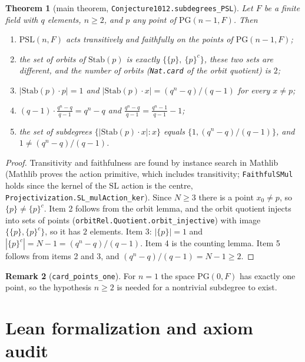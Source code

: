 \documentclass[11pt]{article}
\newtheorem{theorem}{Theorem}
\theoremstyle{definition}
\newtheorem{remark}[theorem]{Remark}
\newcommand{\PSL}{\mathrm{PSL}}
\newcommand{\SL}{\mathrm{SL}}
\newcommand{\PG}{\mathrm{PG}}
\newcommand{\Stab}{\mathrm{Stab}}
\begin{document}
\begin{theorem}[main theorem, \texttt{Conjecture1012.subdegrees\_PSL}]
Let $F$ be a finite field with $q$ elements, $n\ge 2$, and $p$ any point of $\PG(n-1,F)$. Then
\begin{enumerate}
\item $\PSL(n,F)$ acts transitively and faithfully on the points of $\PG(n-1,F)$;
\item the set of orbits of $\Stab(p)$ is exactly $\{\{p\},\ \{p\}^c\}$, these two sets are
  different, and the number of orbits (\texttt{Nat.card} of the orbit quotient) is $2$;
\item $|\Stab(p)\cdot p|=1$ and $|\Stab(p)\cdot x|=(q^n-q)/(q-1)$ for every $x\neq p$;
\item $(q-1)\cdot\frac{q^n-q}{q-1}=q^n-q$ and $\frac{q^n-q}{q-1}=\frac{q^n-1}{q-1}-1$;
\item the set of subdegrees $\{|\Stab(p)\cdot x| : x\}$ equals $\{1,(q^n-q)/(q-1)\}$, and
  $1\neq(q^n-q)/(q-1)$.
\end{enumerate}
\end{theorem}
\begin{proof}
Transitivity and faithfulness are found by instance search in Mathlib (Mathlib proves the action primitive, which includes transitivity;
\texttt{FaithfulSMul} holds since the kernel of the $\SL$ action is the centre,
\texttt{Projectivization.SL\_mulAction\_ker}). Since $N\ge 3$ there is a point $x_0\neq p$, so
$\{p\}\neq\{p\}^c$. Item 2 follows from the orbit lemma, and the orbit quotient injects into sets
of points (\texttt{orbitRel.Quotient.orbit\_injective}) with image $\{\{p\},\{p\}^c\}$, so it has
$2$ elements. Item 3: $|\{p\}|=1$ and $|\{p\}^c|=N-1=(q^n-q)/(q-1)$. Item 4 is the counting lemma.
Item 5 follows from items 2 and 3, and $(q^n-q)/(q-1)=N-1\ge 2$.
\end{proof}

\begin{remark}[\texttt{card\_points\_one}]
For $n=1$ the space $\PG(0,F)$ has exactly one point, so the hypothesis $n\ge 2$ is needed for a
nontrivial subdegree to exist.
\end{remark}

\section{Lean formalization and axiom audit}
\end{document}
